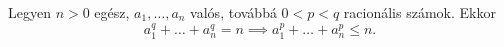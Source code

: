 Legyen $n>0$ egész, $a_1,\hdots,a_n$ valós, továbbá $0<p<q$ racionális számok. Ekkor
$$
a_1^q+\hdots +a_n^q = n \implies a_1^p+\hdots +a_n^p \le n .
$$

